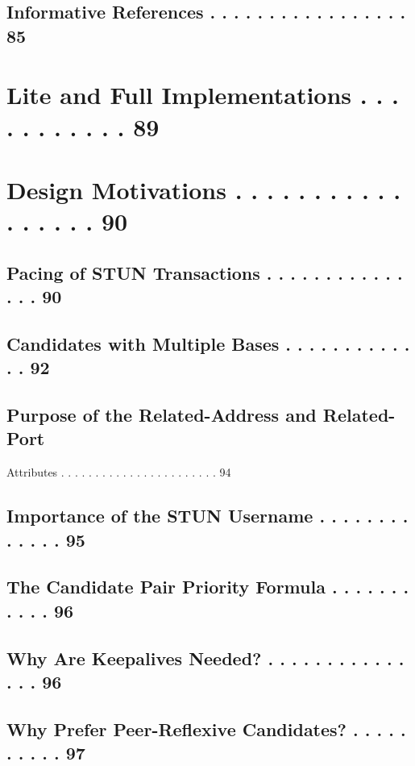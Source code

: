 \documentclass{article}
\begin{document}
\subsection{Informative References . . . . . . . . . . . . . . . . .  85}

\section{Lite and Full Implementations  . . . . . . . . . . .  89}

\section{Design Motivations . . . . . . . . . . . . . . . . .  90}

\subsection{Pacing of STUN Transactions . . . . . . . . . . . . . . .  90}

\subsection{Candidates with Multiple Bases  . . . . . . . . . . . . .  92}

\subsection{Purpose of the Related-Address and Related-Port}

Attributes  . . . . . . . . . . . . . . . . . . . . . . .  94

\subsection{Importance of the STUN Username . . . . . . . . . . . . .  95}

\subsection{The Candidate Pair Priority Formula . . . . . . . . . . .  96}

\subsection{Why Are Keepalives Needed?  . . . . . . . . . . . . . . .  96}

\subsection{Why Prefer Peer-Reflexive Candidates? . . . . . . . . . .  97}
\end{document}
